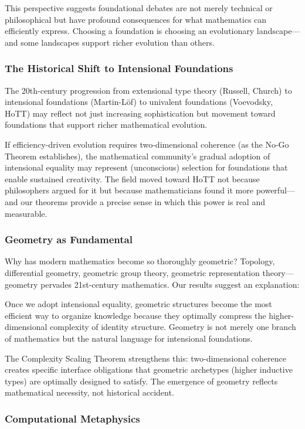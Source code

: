 \documentclass[11pt]{article}
\theoremstyle{definition}
\theoremstyle{remark}
\begin{document}
This perspective suggests foundational debates are not merely technical or philosophical but have
profound consequences for what mathematics can efficiently express. Choosing a foundation is choosing
an evolutionary landscape---and some landscapes support richer evolution than others.

\subsubsection{The Historical Shift to Intensional Foundations}

The 20th-century progression from extensional type theory (Russell, Church) to intensional foundations
(Martin-Löf) to univalent foundations (Voevodsky, HoTT) may reflect not just increasing sophistication
but movement toward foundations that support richer mathematical evolution.

If efficiency-driven evolution requires two-dimensional coherence (as the No-Go Theorem establishes),
the mathematical community's gradual adoption of intensional equality may represent (unconscious)
selection for foundations that enable sustained creativity. The field moved toward HoTT not because
philosophers argued for it but because mathematicians found it more powerful---and our theorems
provide a precise sense in which this power is real and measurable.

\subsubsection{Geometry as Fundamental}

Why has modern mathematics become so thoroughly geometric? Topology, differential geometry,
geometric group theory, geometric representation theory---geometry pervades 21st-century mathematics.
Our results suggest an explanation:

Once we adopt intensional equality, geometric structures become the most efficient way to organize
knowledge because they optimally compress the higher-dimensional complexity of identity structure.
Geometry is not merely one branch of mathematics but the natural language for intensional foundations.

The Complexity Scaling Theorem strengthens this: two-dimensional coherence creates specific interface
obligations that geometric archetypes (higher inductive types) are optimally designed to satisfy.
The emergence of geometry reflects mathematical necessity, not historical accident.

\subsubsection{Computational Metaphysics}
\end{document}
